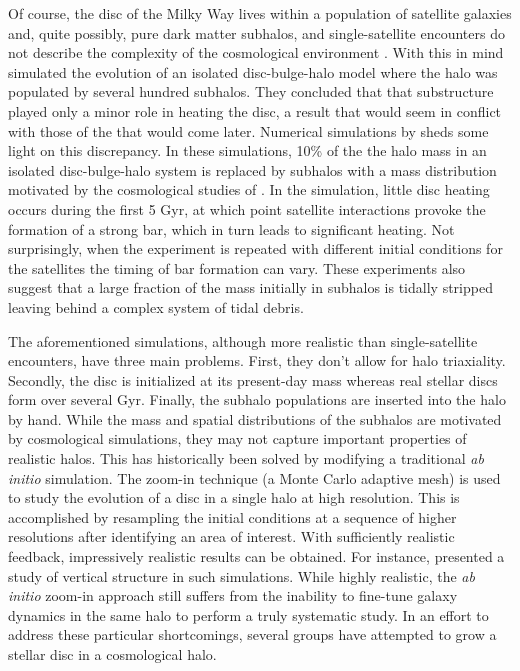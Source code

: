 Of course, the disc of the Milky Way lives within a population of satellite galaxies and, quite possibly, pure dark matter subhalos, and single-satellite encounters do not describe the complexity of the cosmological environment \citep{Klypin1999,mooresubhalos,springel2008}.  With this in mind \citet{Font2001} simulated the evolution of an isolated disc-bulge-halo model where the halo was populated by several hundred subhalos.  They concluded that that substructure played only a minor role in heating the disc, a result that would seem in conflict with those of the \citet{kazantzidis2008} that would come later.  Numerical simulations by \citet{gauthier2006, dubinski2008} sheds some light on this discrepancy.  In these simulations, 10\% of the the halo mass in an isolated disc-bulge-halo system is replaced by subhalos with a mass distribution motivated by the cosmological studies of \citet{gao2004}.  In the \citet{gauthier2006} simulation, little disc heating occurs during the first 5 Gyr, at which point satellite interactions provoke the formation of a strong bar, which in turn leads to significant heating.  Not surprisingly, when the experiment is repeated with different initial conditions for the satellites the timing of bar formation can vary.  These experiments also suggest that a large fraction of the mass initially in subhalos is tidally stripped leaving behind a complex system of tidal debris.

The aforementioned simulations, although more realistic than single-satellite encounters, have three main problems.  First, they don't allow for halo triaxiality.  Secondly, the disc is initialized at its present-day mass whereas real stellar discs form over several Gyr.  Finally, the subhalo populations are inserted into the halo by hand.  While the mass and spatial distributions of the subhalos are motivated by cosmological simulations, they may not capture important properties of realistic halos. This has historically been solved by modifying a traditional \textit{ab initio} simulation. The zoom-in technique (a Monte Carlo adaptive mesh) is used to study the evolution of a disc in a single halo at high resolution.  This is accomplished by resampling the initial conditions at a sequence of higher resolutions after identifying an area of interest. With sufficiently realistic feedback, impressively realistic results can be obtained. For instance, \citet{gomez_2017} presented a study of vertical structure in such simulations. While highly realistic, the \textit{ab initio} zoom-in approach still suffers from the inability to fine-tune galaxy dynamics in the same halo to perform a truly systematic study. In an effort to address these particular shortcomings, several groups have attempted to grow a stellar disc in a cosmological halo.  


